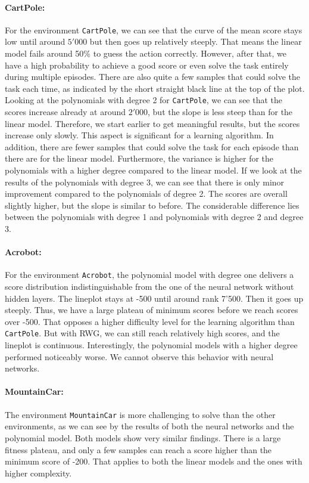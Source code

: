 \paragraph*{CartPole:} For the environment \verb|CartPole|, we can see that the curve of the mean score stays low until around $5'000$ but then goes up relatively steeply. That means the linear model fails around 50\% to guess the action correctly. However, after that, we have a high probability to achieve a good score or even solve the task entirely during multiple episodes. There are also quite a few samples that could solve the task each time, as indicated by the short straight black line at the top of the plot. Looking at the polynomials with degree 2 for \verb|CartPole|, we can see that the scores increase already at around $2'000$, but the slope is less steep than for the linear model. Therefore, we start earlier to get meaningful results, but the scores increase only slowly. This aspect is significant for a learning algorithm. In addition, there are fewer samples that could solve the task for each episode than there are for the linear model. Furthermore, the variance is higher for the polynomials with a higher degree compared to the linear model. If we look at the results of the polynomials with degree 3, we can see that there is only minor improvement compared to the polynomials of degree 2. The scores are overall slightly higher, but the slope is similar to before. The considerable difference lies between the polynomials with degree 1 and polynomials with degree 2 and degree 3.

\paragraph*{Acrobot:} For the environment \verb|Acrobot|, the polynomial model with degree one delivers a score distribution indistinguishable from the one of the neural network without hidden layers. The lineplot stays at -500 until around rank 7'500. Then it goes up steeply. Thus, we have a large plateau of minimum scores before we reach scores over -500. That opposes a higher difficulty level for the learning algorithm than \verb|CartPole|. But with RWG, we can still reach relatively high scores, and the lineplot is continuous. Interestingly, the polynomial models with a higher degree performed noticeably worse. We cannot observe this behavior with neural networks.

\paragraph*{MountainCar:} The environment \verb|MountainCar| is more challenging to solve than the other environments, as we can see by the results of both the neural networks and the polynomial model. Both models show very similar findings. There is a large fitness plateau, and only a few samples can reach a score higher than the minimum score of -200. That applies to both the linear models and the ones with higher complexity.

